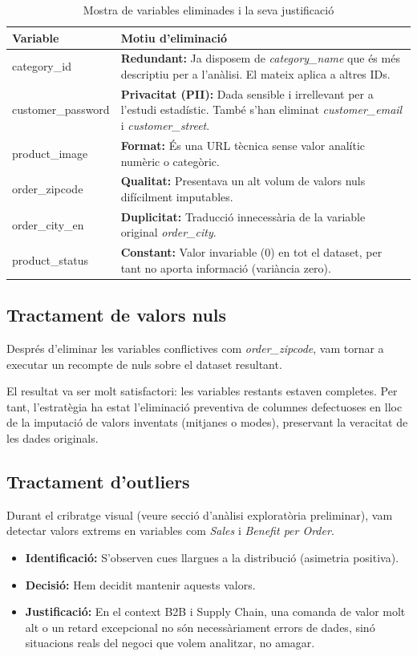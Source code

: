 \documentclass[12pt,a4paper]{article}
\begin{document}
\begin{table}[H]
\centering
\caption{Mostra de variables eliminades i la seva justificació}
\label{tab:vars_eliminades}
\small
\begin{tabular}{lp{9cm}}
\toprule
\textbf{Variable} & \textbf{Motiu d'eliminació} \\
\midrule
category\_id & \textbf{Redundant:} Ja disposem de \textit{category\_name} que és més descriptiu per a l'anàlisi. El mateix aplica a altres IDs. \\
customer\_password & \textbf{Privacitat (PII):} Dada sensible i irrellevant per a l'estudi estadístic. També s'han eliminat \textit{customer\_email} i \textit{customer\_street}. \\
product\_image & \textbf{Format:} És una URL tècnica sense valor analític numèric o categòric. \\
order\_zipcode & \textbf{Qualitat:} Presentava un alt volum de valors nuls difícilment imputables. \\
order\_city\_en & \textbf{Duplicitat:} Traducció innecessària de la variable original \textit{order\_city}. \\
product\_status & \textbf{Constant:} Valor invariable (0) en tot el dataset, per tant no aporta informació (variància zero). \\
\bottomrule
\end{tabular}
\end{table}
\newpage
\subsection{Tractament de valors nuls}
Després d'eliminar les variables conflictives com \textit{order\_zipcode}, vam tornar a executar un recompte de nuls sobre el dataset resultant. 

El resultat va ser molt satisfactori: les variables restants  estaven completes. Per tant, l'estratègia ha estat l'eliminació preventiva de columnes defectuoses en lloc de la imputació de valors inventats (mitjanes o modes), preservant la veracitat de les dades originals.
\subsection{Tractament d'outliers}
Durant el cribratge visual (veure secció d'anàlisi exploratòria preliminar), vam detectar valors extrems en variables com \textit{Sales} i \textit{Benefit per Order}.
\begin{itemize}
    \item \textbf{Identificació:} S'observen cues llargues a la distribució (asimetria positiva).
    \item \textbf{Decisió:} Hem decidit mantenir aquests valors. 
    \item \textbf{Justificació:} En el context B2B i Supply Chain, una comanda de valor molt alt o un retard excepcional no són necessàriament errors de dades, sinó situacions reals del negoci que volem analitzar, no amagar.
\end{itemize}
\end{document}
